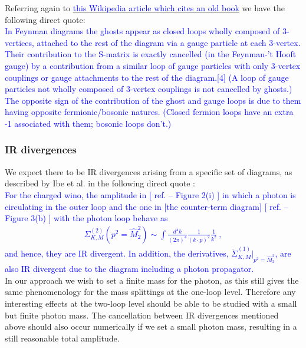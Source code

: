 \documentclass[11pt]{article}
\begin{document}
Referring again to \href{https://en.wikipedia.org/wiki/Faddeev\%E2\%80\%93Popov_ghost}{\textcolor{blue}{this Wikipedia article which cites an old book}} we have the following direct quote:\\

\textcolor{blue}{In Feynman diagrams the ghosts appear as closed loops wholly composed of 3-vertices, attached to the rest of the diagram via a gauge particle at each 3-vertex. Their contribution to the S-matrix is exactly cancelled (in the Feynman-'t Hooft gauge) by a contribution from a similar loop of gauge particles with only 3-vertex couplings or gauge attachments to the rest of the diagram.[4] (A loop of gauge particles not wholly composed of 3-vertex couplings is not cancelled by ghosts.) The opposite sign of the contribution of the ghost and gauge loops is due to them having opposite fermionic/bosonic natures. (Closed fermion loops have an extra -1 associated with them; bosonic loops don't.)}\\

\subsubsection{IR divergences}

We expect there to be IR divergences arising from a specific set of diagrams, as described by Ibe et al. in the following direct quote \cite{Ibe2013a}:\\

\textcolor{blue}{
For the charged wino, the amplitude in [ ref. \cite{Ibe2013a} -- Figure 2(i) ] in which a photon is circulating
in the outer loop and the one in [the counter-term diagram] [ ref. \cite{Ibe2013a} -- Figure 3(b) ] with the photon loop behave as
\begin{eqnarray}
\Sigma_{K,M}^{(2)}(p^2=\hat{M}_2^2) \sim
\int \frac{d^4 k}{(2\pi)^4} \frac{1}{(k\cdot p)^2} \frac{1}{k^2} \ ,
\end{eqnarray}
and hence, they are IR divergent.
In addition, the derivatives, $\dot{\Sigma}_{K,M}^{(1)} |_{p^2=\hat{M}_2^2}$, 
are also IR divergent due to the diagram including a photon propagator. 
}\\

In our approach we wish to set a finite mass for the photon, as this still gives the same phenomenology for the mass splittings at the one-loop level.  Therefore any interesting effects at the two-loop level should be able to be studied with a small but finite photon mass.  The cancellation between IR divergences mentioned above should also occur numerically if we set a small photon mass, resulting in a still reasonable total amplitude.\\
\end{document}
